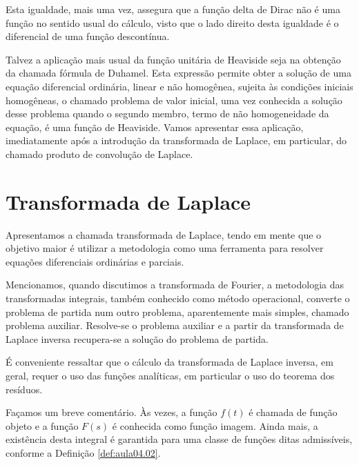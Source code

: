 Esta igualdade, mais uma vez, assegura que a função delta de Dirac não é uma função no sentido usual do cálculo, visto que o lado direito desta igualdade é o diferencial de uma função descontínua.

Talvez a aplicação mais usual da função unitária de Heaviside seja na obtenção da chamada fórmula de Duhamel. Esta expressão permite obter a solução de uma equação diferencial ordinária, linear e não homogênea, sujeita às condições iniciais homogêneas, o chamado problema de valor inicial, uma vez conhecida a solução desse problema quando o segundo membro, termo de não homogeneidade da equação, é uma função de Heaviside. Vamos apresentar essa aplicação, imediatamente após a introdução da transformada de Laplace, em particular, do chamado produto de convolução de Laplace.

\section{Transformada de Laplace}

    Apresentamos a chamada transformada de Laplace, tendo em mente que o objetivo maior é utilizar a metodologia como uma ferramenta para resolver equações diferenciais ordinárias e parciais.

    Mencionamos, quando discutimos a transformada de Fourier, a metodologia das transformadas integrais, também conhecido como método operacional, converte o problema de partida num outro problema, aparentemente mais simples, chamado problema auxiliar. Resolve-se o problema auxiliar e a partir da transformada de Laplace inversa recupera-se a solução do problema de partida.

    É conveniente ressaltar que o cálculo da transformada de Laplace inversa, em geral, requer o uso das funções analíticas, em particular o uso do teorema dos resíduos.

\definicao{Transformada de Laplace}{def:aula04.12}{%
Seja a função $f(t)$, definida no intervalo semi-infinito $[0, \infty)$. Define-se a transformada de Laplace de $f(t)$, denotada por $F(s) = \mathscr{L}[f(t)]$, sendo $s$ o parâmetro da transformada, a partir da integral imprópria
$$F(s) \equiv \mathscr{L}[f(t)] = \int_{0}^{\infty} e^{-st} f(t) dt,$$
com $\operatorname{Re}(s) > 0$, sempre que a integral exista.
}

Façamos um breve comentário. Às vezes, a função $f(t)$ é chamada de função objeto e a função $F(s)$ é conhecida como função imagem. Ainda mais, a existência desta integral é garantida para uma classe de funções ditas admissíveis, conforme a Definição \ref{def:aula04.02}.



